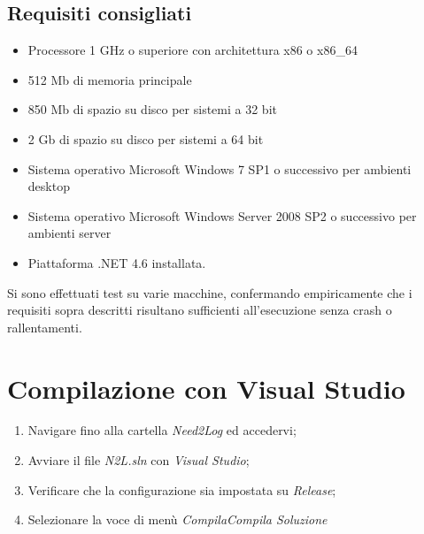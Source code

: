 \documentclass[a4paper,10pt]{report}
\begin{document}
		\subsection{Requisiti consigliati}
			\begin{itemize}
				\item Processore 1 GHz o superiore con architettura x86 o x86\_64
				\item 512 Mb di memoria principale
				\item 850 Mb di spazio su disco per sistemi a 32 bit
				\item 2 Gb di spazio su disco per sistemi a 64 bit
				\item Sistema operativo Microsoft Windows 7 SP1 o
					successivo per ambienti desktop
				\item Sistema operativo Microsoft Windows Server 2008 SP2 o
					successivo per ambienti server
				\item Piattaforma .NET 4.6 installata.
			\end{itemize}
			Si sono effettuati test su varie macchine, confermando empiricamente che
				i requisiti sopra descritti risultano sufficienti all’esecuzione senza
				crash o rallentamenti.
  \section{Compilazione con Visual Studio}
		\begin{enumerate}
			\item Navigare fino alla cartella {\itshape Need2Log} ed accedervi;
			\item Avviare il file {\itshape N2L.sln} con {\itshape Visual Studio};
			\item Verificare che la configurazione sia impostata su {\itshape Release};
			\item Selezionare la voce di menù {\itshape Compila}{\rightarrow}{\itshape Compila Soluzione}
			\end{enumerate}
\end{document}
